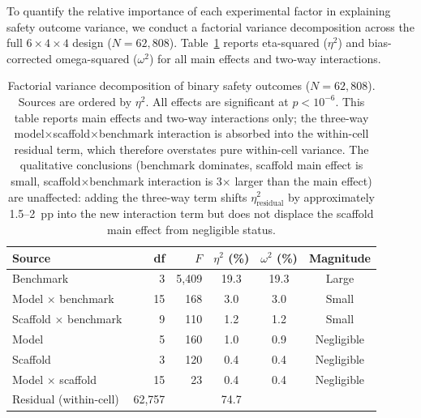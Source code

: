
To quantify the relative importance of each experimental factor in explaining safety outcome variance, we conduct a factorial variance decomposition across the full $6 \times 4 \times 4$ design ($N = 62{,}808$).  Table~\ref{tab:variance-decomposition} reports eta-squared ($\eta^2$) and bias-corrected omega-squared ($\omega^2$) for all main effects and two-way interactions.

\begin{table}[h]
\caption{Factorial variance decomposition of binary safety outcomes ($N = 62{,}808$).  Sources are ordered by $\eta^2$.  All effects are significant at $p < 10^{-6}$.  This table reports main effects and two-way interactions only; the three-way model$\times$scaffold$\times$benchmark interaction is absorbed into the within-cell residual term, which therefore overstates pure within-cell variance.  The qualitative conclusions (benchmark dominates, scaffold main effect is small, scaffold$\times$benchmark interaction is 3$\times$ larger than the main effect) are unaffected: adding the three-way term shifts $\eta^2_{\text{residual}}$ by approximately 1.5--2~pp into the new interaction term but does not displace the scaffold main effect from negligible status.}
\label{tab:variance-decomposition}
\centering
\small
\begin{tabular}{@{}lrrccc@{}}
\toprule
\textbf{Source} & \textbf{df} & \textbf{$F$} & \textbf{$\eta^2$ (\%)} & \textbf{$\omega^2$ (\%)} & \textbf{Magnitude} \\
\midrule
Benchmark                   & 3      & 5{,}409  & 19.3 & 19.3 & Large \\
Model $\times$ benchmark    & 15     & 168      & 3.0  & 3.0  & Small \\
Scaffold $\times$ benchmark & 9      & 110      & 1.2  & 1.2  & Small \\
Model                       & 5      & 160      & 1.0  & 0.9  & Negligible \\
Scaffold                    & 3      & 120      & 0.4  & 0.4  & Negligible \\
Model $\times$ scaffold     & 15     & 23       & 0.4  & 0.4  & Negligible \\
\midrule
Residual (within-cell)      & 62{,}757 &       & 74.7 &      & \\
\bottomrule
\end{tabular}
\end{table}

